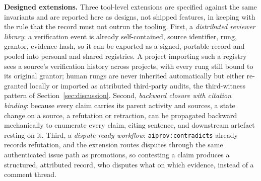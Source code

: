 
\textbf{Designed extensions.} Three tool-level extensions are
specified against the same invariants and are reported here as
designs, not shipped features, in keeping with the rule that the
record must not outrun the tooling. First, a \emph{distributed
reviewer library}: a verification event is already self-contained,
source identifier, rung, grantor, evidence hash, so it can be
exported as a signed, portable record and pooled into personal and
shared registries. A project importing such a registry sees a
source's verification history across projects, with every rung still
bound to its original grantor; human rungs are never inherited
automatically but either re-granted locally or imported as attributed
third-party audits, the third-witness pattern of
Section~\ref{sec:discussion}. Second, \emph{backward closure with
citation binding}: because every claim carries its parent activity
and sources, a state change on a source, a refutation or retraction,
can be propagated backward mechanically to enumerate every claim,
citing sentence, and downstream artefact resting on it. Third, a
\emph{dispute-ready workflow}: \texttt{aiprov:contradicts} already
records refutation, and the extension routes disputes through the
same authenticated issue path as promotions, so contesting a claim
produces a structured, attributed record, who disputes what on which
evidence, instead of a comment thread.
